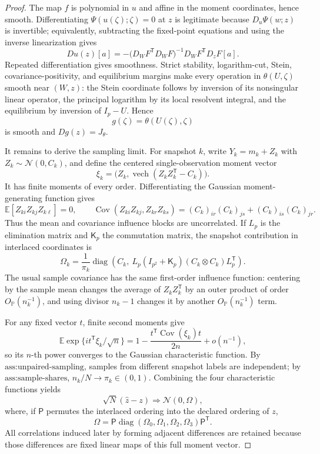 \documentclass{article}
\begin{document}
\begin{proof}
The map \(f\) is polynomial in \(u\) and affine in the moment coordinates, hence smooth.  Differentiating \(\Psi(u(\zeta);\zeta)=0\) at \(z\) is legitimate because \(D_u\Psi(w;z)\) is invertible; equivalently, subtracting the fixed-point equations and using the inverse linearization gives
\[
 Du(z)[a]=-\bigl(D_WF^{\mathsf T}D_WF\bigr)^{-1}
 D_WF^{\mathsf T}D_zF[a].
\]
Repeated differentiation gives smoothness.  Strict stability, logarithm-cut, Stein, covariance-positivity, and equilibrium margins make every operation in \(\theta(U,\zeta)\) smooth near \((W,z)\): the Stein coordinate follows by inversion of its nonsingular linear operator, the principal logarithm by its local resolvent integral, and the equilibrium by inversion of \(I_p-U\).  Hence
\[
 g(\zeta)=\theta(U(\zeta),\zeta)
\]
is smooth and \(Dg(z)=J_\theta\).

It remains to derive the sampling limit.  For snapshot \(k\), write \(Y_k=m_k+Z_k\) with \(Z_k\sim\mathcal N(0,C_k)\), and define the centered single-observation moment vector
\[
 \xi_k=\bigl(Z_k,\operatorname{vech}(Z_kZ_k^{\mathsf T}-C_k)\bigr).
\]
It has finite moments of every order.  Differentiating the Gaussian moment-generating function gives
\[
 \mathbb E[Z_{ki}Z_{kj}Z_{k\ell}]=0,\qquad
 \operatorname{Cov}(Z_{ki}Z_{kj},Z_{kr}Z_{ks})
 =(C_k)_{ir}(C_k)_{js}+(C_k)_{is}(C_k)_{jr}.
\]
Thus the mean and covariance influence blocks are uncorrelated.  If \(L_p\) is the elimination matrix and \(\mathsf K_p\) the commutation matrix, the snapshot contribution in interlaced coordinates is
\[
 \Omega_k=\frac1{\pi_k}\operatorname{diag}\left(
 C_k,\ L_p(I_{p^2}+\mathsf K_p)(C_k\otimes C_k)L_p^{\mathsf T}\right).
\]
The usual sample covariance has the same first-order influence function: centering by the sample mean changes the average of \(Z_kZ_k^{\mathsf T}\) by an outer product of order \(O_{\mathbb P}(n_k^{-1})\), and using divisor \(n_k-1\) changes it by another \(O_{\mathbb P}(n_k^{-1})\) term.

For any fixed vector \(t\), finite second moments give
\[
 \mathbb E\exp\{it^{\mathsf T}\xi_k/\sqrt n\}
 =1-\frac{t^{\mathsf T}\operatorname{Cov}(\xi_k)t}{2n}+o(n^{-1}),
\]
so its \(n\)-th power converges to the Gaussian characteristic function.  By \(\text{ass:unpaired-sampling}\), samples from different snapshot labels are independent; by \(\text{ass:sample-shares}\), \(n_k/N\to\pi_k\in(0,1)\).  Combining the four characteristic functions yields
\[
 \sqrt N(\widehat z-z)\Longrightarrow\mathcal N(0,\Omega),
\]
where, if \(\mathsf P\) permutes the interlaced ordering into the declared ordering of \(z\),
\[
 \Omega=\mathsf P\operatorname{diag}(\Omega_0,\Omega_1,\Omega_2,\Omega_3)\mathsf P^{\mathsf T}.
\]
All correlations induced later by forming adjacent differences are retained because those differences are fixed linear maps of this full moment vector.


\end{proof}
\end{document}
